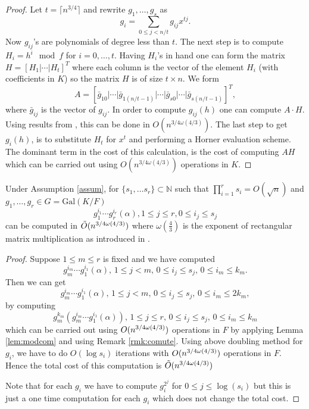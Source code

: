 \begin{proof}
Let $t = \lceil n^{3/4} \rceil$ and rewrite $g_1 , \ldots , g_s$ as 
$$g_i = \sum_{0 \leq j < n/t} g_{ij}x^{tj}.$$
Now $g_{ij}$'s are polynomials of degree less than $t$. The next step is to compute $H_i = h^i \mod f$ for $i = 0 , \ldots , t$.
Having $H_i$'s in hand one can form the matrix $H = \left[ H_1 \vert \cdots \vert H_t \right]^T$ where each column is the vector of 
the element $H_i$ (with coefficients in $K$) so the matrix $H$ is of size $t \times n$. We form 
$$A = \left[\bar{g}_{10}\vert \cdots \vert \bar{g}_{1(n/t-1)}\vert \cdots \vert \bar{g}_{s0}\vert \cdots \vert \bar{g}_{s(n/t-1)}\right]^T,$$
where $\bar{g}_{ij}$ is the  vector of $g_{ij}$. In order to compute $g_{ij}(h)$ one can compute $A \cdot H$. Using 
results from \cite{LeGall}, this can be done in $O(n^{3/4 \omega(4/3)})$. The last step to get $g_i(h)$, is to substitute $H_t$ 
for $x^t$ and performing a Horner evaluation scheme. The dominant term in the cost of this calculation, is the cost of computing $AH$ which can be carried out using $O(n^{3/4 \omega(4/3)})$ operations in $K$.
\end{proof}

\begin{lemma}\cite{Kaltofen}\label{lem:selfcomp}
Under Assumption \ref{assum}, for $\lbrace s_1, \ldots s_r \rbrace \subset \mathbb{N}$
such that $\prod_{i = 1}^r s_i = O(\sqrt{n})$ and $g_1, \ldots , g_{r} \in G = \mathrm{Gal}(K/F)$ 
$$g_1^{i_1}\cdots g_r^{i_r}(\alpha) , 1 \leq j \leq r, 
0 \leq i_j \leq s_j$$ can be 
computed in $\tilde{O}(n^{3/4 \omega(4/3)})$ where $\omega(\frac{4}{3})$ is the exponent of rectangular matrix 
multiplication as introduced in \cite{LeGall}. 
\end{lemma}

\begin{proof}
Suppose $1 \leq m \leq r$ is fixed and we have computed $$g_m^{i_m}\cdots g_1^{i_1}(\alpha) ,\,  1 \leq j < m, \, 
0 \leq i_j \leq s_j, \, 0 \leq i_m \leq k_m.$$
Then we can get $$g_m^{i_m}\cdots g_1^{i_1}(\alpha) ,\, 1 \leq j < m, \, 0 \leq i_j \leq s_j,\, 0 \leq i_m \leq 2k_m,$$
by computing 
$$g_m^{k_m}(g_m^{i_m}\cdots g_1^{i_1}(\alpha)),\, 1 \leq j \leq r,\, 0 \leq i_j \leq s_j,\, 0 \leq i_m \leq k_m$$
which can be carried out using $O(n^{3/4 \omega(4/3)})$ operations in $F$ by applying Lemma \ref{lem:modcom} and using Remark \ref{rmk:comute}.
Using above doubling method for $g_i$, we have to do $O(\log s_i)$ iterations with $O(n^{3/4 \omega(4/3)})$ operations in $F$. Hence the total cost of this 
computation is $\tilde{O}(n^{3/4 \omega(4/3)})$

Note that for each $g_i$ we have to compute $g_i^{2^j}$ for $0 \leq j \leq \log(s_i)$ but this is just a one time computation for each $g_i$
which does not change the total cost.
\end{proof}

